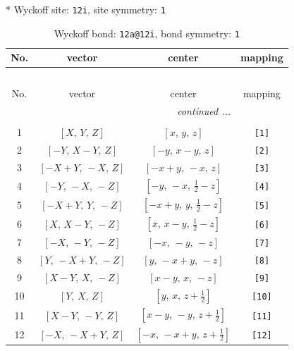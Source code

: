\documentclass[fleqn,8pt]{jsarticle}
\begin{document}
* Wyckoff site: {\tt 12i}, site symmetry: {\tt 1}
\renewcommand{\arraystretch}{1.2}
\begin{longtable}{cccc}
\caption{Wyckoff bond: {\tt 12a@12i}, bond symmetry: {\tt 1}}
 \\
 \hline \hline
No. & vector & center & mapping \\ \hline \endfirsthead

\multicolumn{3}{l}{\tablename\ \thetable{}} \\
 \hline \hline
No. & vector & center & mapping \\ \hline \endhead

 \hline \hline
\multicolumn{3}{r}{\footnotesize\it continued ...} \\ \endfoot

 \hline \hline
\multicolumn{3}{r}{} \\ \endlastfoot

1 & $\left[ X,\, Y,\, Z \right]$ & $\left[ x,\, y,\, z \right]$ & {\tt [1]} \\ \hline
2 & $\left[ - Y,\, X - Y,\, Z \right]$ & $\left[ - y,\, x - y,\, z \right]$ & {\tt [2]} \\ \hline
3 & $\left[ - X + Y,\, - X,\, Z \right]$ & $\left[ - x + y,\, - x,\, z \right]$ & {\tt [3]} \\ \hline
4 & $\left[ - Y,\, - X,\, - Z \right]$ & $\left[ - y,\, - x,\, \frac{1}{2} - z \right]$ & {\tt [4]} \\ \hline
5 & $\left[ - X + Y,\, Y,\, - Z \right]$ & $\left[ - x + y,\, y,\, \frac{1}{2} - z \right]$ & {\tt [5]} \\ \hline
6 & $\left[ X,\, X - Y,\, - Z \right]$ & $\left[ x,\, x - y,\, \frac{1}{2} - z \right]$ & {\tt [6]} \\ \hline
7 & $\left[ - X,\, - Y,\, - Z \right]$ & $\left[ - x,\, - y,\, - z \right]$ & {\tt [7]} \\ \hline
8 & $\left[ Y,\, - X + Y,\, - Z \right]$ & $\left[ y,\, - x + y,\, - z \right]$ & {\tt [8]} \\ \hline
9 & $\left[ X - Y,\, X,\, - Z \right]$ & $\left[ x - y,\, x,\, - z \right]$ & {\tt [9]} \\ \hline
10 & $\left[ Y,\, X,\, Z \right]$ & $\left[ y,\, x,\, z + \frac{1}{2} \right]$ & {\tt [10]} \\ \hline
11 & $\left[ X - Y,\, - Y,\, Z \right]$ & $\left[ x - y,\, - y,\, z + \frac{1}{2} \right]$ & {\tt [11]} \\ \hline
12 & $\left[ - X,\, - X + Y,\, Z \right]$ & $\left[ - x,\, - x + y,\, z + \frac{1}{2} \right]$ & {\tt [12]} \\
\end{longtable}
\end{document}
